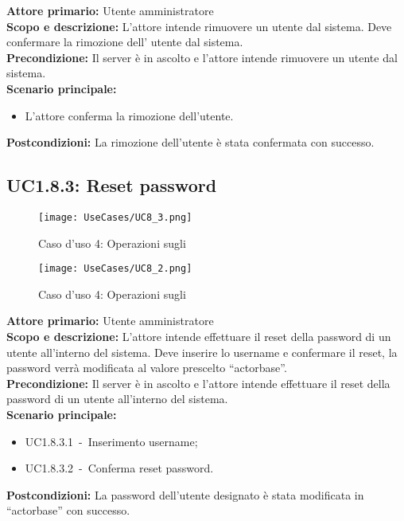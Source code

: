 \documentclass{scalatekids-article}
\begin{document}
\textbf{Attore primario:} Utente amministratore\\
\textbf{Scopo e descrizione:} L'attore intende rimuovere un utente dal sistema. Deve confermare la rimozione dell' utente dal sistema.\\
\textbf{Precondizione:} Il server è in ascolto e l'attore intende rimuovere un utente dal sistema.\\
\textbf{Scenario principale:}
\begin{itemize}
\item L'attore conferma la rimozione dell'utente.
\end{itemize}
\textbf{Postcondizioni:} La rimozione dell'utente è stata confermata con successo.

\subsection{UC1.8.3: Reset password}

\begin{figure}[H]
  \begin{center}
    \texttt{[image: UseCases/UC8\_3.png]}
    \caption*{Caso d'uso 4: Operazioni sugli }
  \end{center}
\end{figure}
\begin{figure}[H]
  \begin{center}
    \texttt{[image: UseCases/UC8\_2.png]}
    \caption*{Caso d'uso 4: Operazioni sugli }
  \end{center}
\end{figure}
\textbf{Attore primario:} Utente amministratore\\
\textbf{Scopo e descrizione:} L'attore intende effettuare il reset della password di un utente all'interno del sistema. Deve inserire lo username e confermare il reset, la password
verrà modificata al valore prescelto ``actorbase''.\\
\textbf{Precondizione:} Il server è in ascolto e l'attore intende effettuare il reset della password di un utente all'interno del sistema.\\
\textbf{Scenario principale:}
\begin{itemize}
\item UC1.8.3.1\ -\ Inserimento username;
\item UC1.8.3.2\ -\ Conferma reset password.
\end{itemize}
\textbf{Postcondizioni:} La password dell'utente designato è stata modificata in ``actorbase'' con successo.
\end{document}
